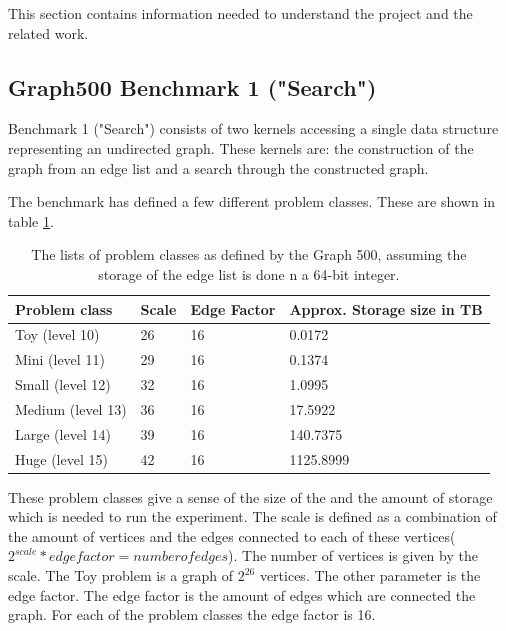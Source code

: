 This section contains information needed to understand the project and the related work.




\subsection{Graph500 Benchmark 1 ("Search")}
Benchmark 1 ("Search")\cite{graph500-specs} consists of two kernels accessing a single data structure representing an undirected graph. These kernels are: the construction of the graph from an edge list and a search through the constructed graph. 

The benchmark has defined a few different problem classes. These are shown in table \ref{tab:problem_scales}. 
\begin{table}[!h]
	\begin{center}
	\begin{tabular}{|l|l|l|l|}
		\hline
		Problem class     & Scale & Edge Factor & Approx. Storage size in TB \\ \hline
		Toy (level 10)    & 26    & 16          & 0.0172                     \\ \hline
		Mini (level 11)   & 29    & 16          & 0.1374                     \\ \hline
		Small (level 12)  & 32    & 16          & 1.0995                     \\ \hline
		Medium (level 13) & 36    & 16          & 17.5922                    \\ \hline
		Large (level 14)  & 39    & 16          & 140.7375                   \\ \hline
		Huge (level 15)   & 42    & 16          & 1125.8999                  \\ \hline
	\end{tabular}
	\caption{The lists of problem classes as defined by the Graph 500, assuming the storage of the edge list is done n a 64-bit integer.}
	\label{tab:problem_scales}
	\end{center}
\end{table}
These problem classes give a sense of the size of the  and the amount of storage which is needed to run the experiment. The scale is defined as a combination of the amount of vertices and the edges connected to each of these vertices($2^{scale} * edge factor = number of edges$). The number of vertices is given by the scale. The Toy problem is a graph of  $2^26$ vertices. The other parameter is the edge factor. The edge factor is the amount of edges which are connected the graph. For each of the problem classes the edge factor is 16. 

